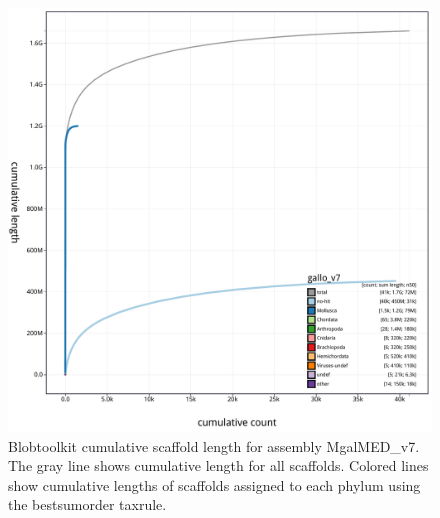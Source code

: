 \documentclass[11pt, a4paper]{article}
\begin{document}
\begin{figure}
	\includegraphics[width=\linewidth]{figures/btk_cumulative_MgalMED_v7}
	\caption{Blobtoolkit cumulative scaffold length for assembly MgalMED\_v7. The gray line shows cumulative length for all scaffolds. Colored lines show cumulative lengths of scaffolds assigned to each phylum using the bestsumorder taxrule.}
	\label{supfig:btk-cumul-MgalMED}
\end{figure}
\end{document}
